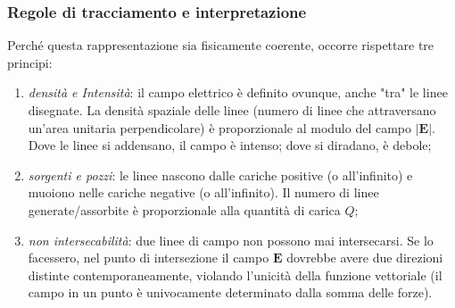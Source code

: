 \documentclass[a4paper,11pt]{report}
\begin{document}
\begin{approfondimento}[title={Le Linee di Campo: Realtà Fisica o Artificio Matematico?}]
\begin{center}
    \end{center}

    \subsubsection{Regole di tracciamento e interpretazione}
    Perché questa rappresentazione sia fisicamente coerente, occorre rispettare tre principi:
    \begin{enumerate}
        \item \textit{densità e Intensità}: il campo elettrico è definito ovunque, anche "tra" le linee disegnate. La densità spaziale delle linee (numero di linee che attraversano un'area unitaria perpendicolare) è proporzionale al modulo del campo $|\bm{E}|$. Dove le linee si addensano, il campo è intenso; dove si diradano, è debole;
        \item \textit{sorgenti e pozzi}: le linee nascono dalle cariche positive (o all'infinito) e muoiono nelle cariche negative (o all'infinito). Il numero di linee generate/assorbite è proporzionale alla quantità di carica $Q$;
        \item \textit{non intersecabilità}: due linee di campo non possono mai intersecarsi. Se lo facessero, nel punto di intersezione il campo $\bm{E}$ dovrebbe avere due direzioni distinte contemporaneamente, violando l'unicità della funzione vettoriale (il campo in un punto è univocamente determinato dalla somma delle forze).
    \end{enumerate}
\end{approfondimento}
\end{document}
